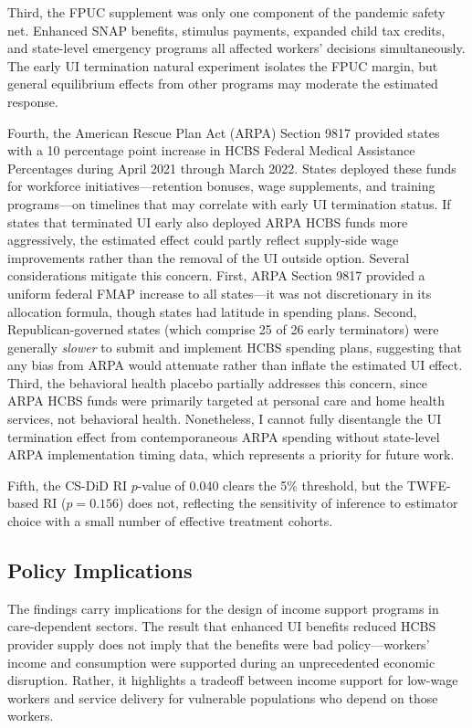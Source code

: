 \documentclass[12pt]{article}
\begin{document}
Third, the FPUC supplement was only one component of the pandemic safety net. Enhanced SNAP benefits, stimulus payments, expanded child tax credits, and state-level emergency programs all affected workers' decisions simultaneously. The early UI termination natural experiment isolates the FPUC margin, but general equilibrium effects from other programs may moderate the estimated response.

Fourth, the American Rescue Plan Act (ARPA) Section 9817 provided states with a 10 percentage point increase in HCBS Federal Medical Assistance Percentages during April 2021 through March 2022. States deployed these funds for workforce initiatives---retention bonuses, wage supplements, and training programs---on timelines that may correlate with early UI termination status. If states that terminated UI early also deployed ARPA HCBS funds more aggressively, the estimated effect could partly reflect supply-side wage improvements rather than the removal of the UI outside option. Several considerations mitigate this concern. First, ARPA Section 9817 provided a uniform federal FMAP increase to all states---it was not discretionary in its allocation formula, though states had latitude in spending plans. Second, Republican-governed states (which comprise 25 of 26 early terminators) were generally \textit{slower} to submit and implement HCBS spending plans, suggesting that any bias from ARPA would attenuate rather than inflate the estimated UI effect. Third, the behavioral health placebo partially addresses this concern, since ARPA HCBS funds were primarily targeted at personal care and home health services, not behavioral health. Nonetheless, I cannot fully disentangle the UI termination effect from contemporaneous ARPA spending without state-level ARPA implementation timing data, which represents a priority for future work.

Fifth, the CS-DiD RI $p$-value of 0.040 clears the 5\% threshold, but the TWFE-based RI ($p = 0.156$) does not, reflecting the sensitivity of inference to estimator choice with a small number of effective treatment cohorts.

\subsection{Policy Implications}

The findings carry implications for the design of income support programs in care-dependent sectors. The result that enhanced UI benefits reduced HCBS provider supply does not imply that the benefits were bad policy---workers' income and consumption were supported during an unprecedented economic disruption. Rather, it highlights a tradeoff between income support for low-wage workers and service delivery for vulnerable populations who depend on those workers.
\end{document}
